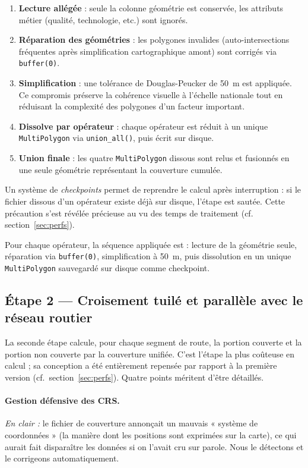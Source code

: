 \documentclass[11pt,a4paper]{article}
\begin{document}
\begin{enumerate}
  \item \textbf{Lecture allégée} : seule la colonne géométrie est conservée, les attributs métier (qualité, technologie, etc.) sont ignorés.
  \item \textbf{Réparation des géométries} : les polygones invalides (auto-intersections fréquentes après simplification cartographique amont) sont corrigés via \texttt{buffer(0)}.
  \item \textbf{Simplification} : une tolérance de Douglas-Peucker de 50~m est appliquée. Ce compromis préserve la cohérence visuelle à l'échelle nationale tout en réduisant la complexité des polygones d'un facteur important.
  \item \textbf{Dissolve par opérateur} : chaque opérateur est réduit à un unique \texttt{MultiPolygon} via \texttt{union\_all()}, puis écrit sur disque.
  \item \textbf{Union finale} : les quatre \texttt{MultiPolygon} dissous sont relus et fusionnés en une seule géométrie représentant la couverture cumulée.
\end{enumerate}

Un système de \emph{checkpoints} permet de reprendre le calcul après interruption : si le fichier dissous d'un opérateur existe déjà sur disque, l'étape est sautée. Cette précaution s'est révélée précieuse au vu des temps de traitement (cf. section~\ref{sec:perfs}).

Pour chaque opérateur, la séquence appliquée est : lecture de la géométrie seule, réparation via \texttt{buffer(0)}, simplification à 50~m, puis dissolution en un unique \texttt{MultiPolygon} sauvegardé sur disque comme checkpoint.

\subsection{Étape 2 — Croisement tuilé et parallèle avec le réseau routier}

La seconde étape calcule, pour chaque segment de route, la portion couverte et la portion non couverte par la couverture unifiée. C'est l'étape la plus coûteuse en calcul ; sa conception a été entièrement repensée par rapport à la première version (cf.~section~\ref{sec:perfs}). Quatre points méritent d'être détaillés.

\paragraph{Gestion défensive des CRS.}
\emph{En clair :} le fichier de couverture annonçait un mauvais « système de coordonnées » (la manière dont les positions sont exprimées sur la carte), ce qui aurait fait disparaître les données si on l'avait cru sur parole. Nous le détectons et le corrigeons automatiquement.
\end{document}
